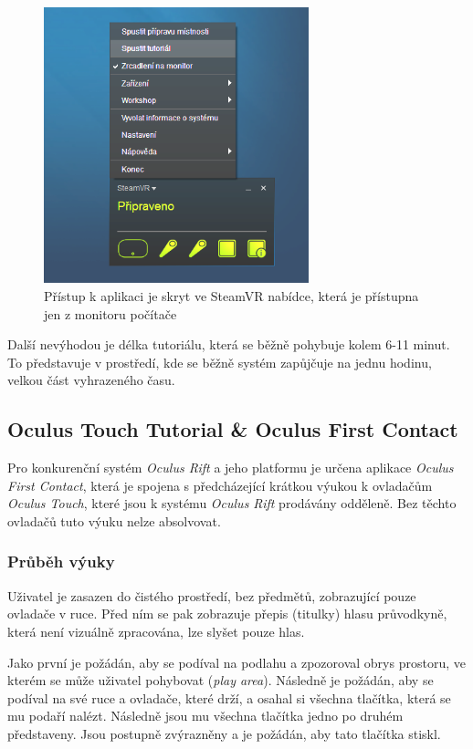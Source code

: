 \begin{figure}[h!]
\centering
\includegraphics[height=8cm]{src/assets/hidden-menu.png}
\caption{Přístup k aplikaci je skryt ve SteamVR nabídce, která je
přístupna jen z monitoru počítače}
\end{figure}

Další nevýhodou je délka tutoriálu, která se běžně pohybuje kolem 6-11
minut. To představuje v prostředí, kde se běžně systém zapůjčuje na
jednu hodinu, velkou část vyhrazeného času.

\subsection{Oculus Touch Tutorial \& Oculus First
Contact}\label{oculus-touch-tutorial-oculus-first-contact}

Pro konkurenční systém \emph{Oculus Rift} a jeho platformu je určena
aplikace \emph{Oculus First Contact}, která je spojena s předcházející
krátkou výukou k ovladačům \emph{Oculus Touch}, které jsou k systému
\emph{Oculus Rift} prodávány odděleně. Bez těchto ovladačů tuto výuku
nelze absolvovat.

\subsubsection{Průběh výuky}\label{prux16fbux11bh-vuxfduky-1}

Uživatel je zasazen do čistého prostředí, bez předmětů, zobrazující
pouze ovladače v ruce. Před ním se pak zobrazuje přepis (titulky) hlasu
průvodkyně, která není vizuálně zpracována, lze slyšet pouze hlas.

Jako první je požádán, aby se podíval na podlahu a zpozoroval obrys
prostoru, ve kterém se může uživatel pohybovat (\emph{play area}).
Následně je požádán, aby se podíval na své ruce a ovladače, které drží,
a osahal si všechna tlačítka, která se mu podaří nalézt. Následně jsou
mu všechna tlačítka jedno po druhém představeny. Jsou postupně
zvýrazněny a je požádán, aby tato tlačítka stiskl.

